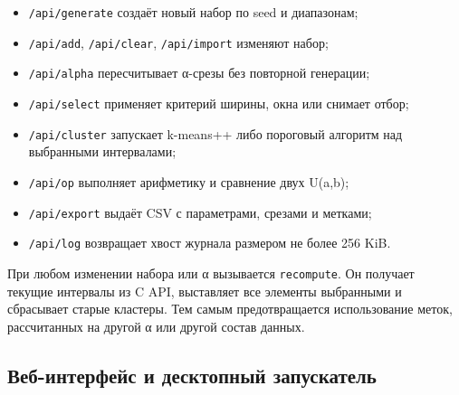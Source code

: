\begin{itemize}
\item \texttt{/api/generate} создаёт новый набор по seed и диапазонам;
\end{itemize}

\begin{itemize}
\item \texttt{/api/add}, \texttt{/api/clear}, \texttt{/api/import} изменяют набор;
\end{itemize}

\begin{itemize}
\item \texttt{/api/alpha} пересчитывает α-срезы без повторной генерации;
\end{itemize}

\begin{itemize}
\item \texttt{/api/select} применяет критерий ширины, окна или снимает отбор;
\end{itemize}

\begin{itemize}
\item \texttt{/api/cluster} запускает k-means++ либо пороговый алгоритм над выбранными интервалами;
\end{itemize}

\begin{itemize}
\item \texttt{/api/op} выполняет арифметику и сравнение двух U(a,b);
\end{itemize}

\begin{itemize}
\item \texttt{/api/export} выдаёт CSV с параметрами, срезами и метками;
\end{itemize}

\begin{itemize}
\item \texttt{/api/log} возвращает хвост журнала размером не более 256 KiB.
\end{itemize}

При любом изменении набора или α вызывается \texttt{recompute}. Он получает текущие интервалы из C API, выставляет все элементы выбранными и сбрасывает старые кластеры. Тем самым предотвращается использование меток, рассчитанных на другой α или другой состав данных.

\subsection{Веб-интерфейс и десктопный запускатель}

